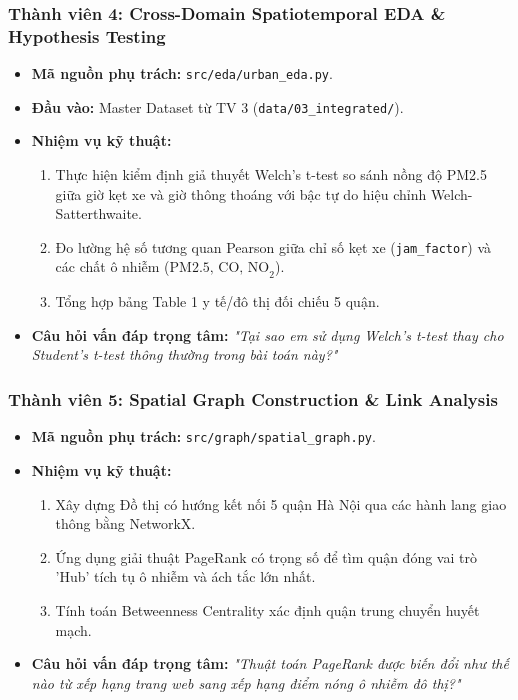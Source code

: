 \documentclass[12pt,a4paper]{article}
\begin{document}
\subsubsection{Thành viên 4: Cross-Domain Spatiotemporal EDA \& Hypothesis Testing}
\begin{itemize}
    \item \textbf{Mã nguồn phụ trách:} \texttt{src/eda/urban\_eda.py}.
    \item \textbf{Đầu vào:} Master Dataset từ TV 3 (\texttt{data/03\_integrated/}).
    \item \textbf{Nhiệm vụ kỹ thuật:}
    \begin{enumerate}
        \item Thực hiện kiểm định giả thuyết Welch's t-test so sánh nồng độ PM2.5 giữa giờ kẹt xe và giờ thông thoáng với bậc tự do hiệu chỉnh Welch-Satterthwaite.
        \item Đo lường hệ số tương quan Pearson giữa chỉ số kẹt xe (\texttt{jam\_factor}) và các chất ô nhiễm ($\text{PM2.5, CO, NO}_2$).
        \item Tổng hợp bảng Table 1 y tế/đô thị đối chiếu 5 quận.
    \end{enumerate}
    \item \textbf{Câu hỏi vấn đáp trọng tâm:} \textit{"Tại sao em sử dụng Welch's t-test thay cho Student's t-test thông thường trong bài toán này?"}
\end{itemize}

\subsubsection{Thành viên 5: Spatial Graph Construction \& Link Analysis}
\begin{itemize}
    \item \textbf{Mã nguồn phụ trách:} \texttt{src/graph/spatial\_graph.py}.
    \item \textbf{Nhiệm vụ kỹ thuật:}
    \begin{enumerate}
        \item Xây dựng Đồ thị có hướng kết nối 5 quận Hà Nội qua các hành lang giao thông bằng NetworkX.
        \item Ứng dụng giải thuật PageRank có trọng số để tìm quận đóng vai trò 'Hub' tích tụ ô nhiễm và ách tắc lớn nhất.
        \item Tính toán Betweenness Centrality xác định quận trung chuyển huyết mạch.
    \end{enumerate}
    \item \textbf{Câu hỏi vấn đáp trọng tâm:} \textit{"Thuật toán PageRank được biến đổi như thế nào từ xếp hạng trang web sang xếp hạng điểm nóng ô nhiễm đô thị?"}
\end{itemize}
\end{document}
